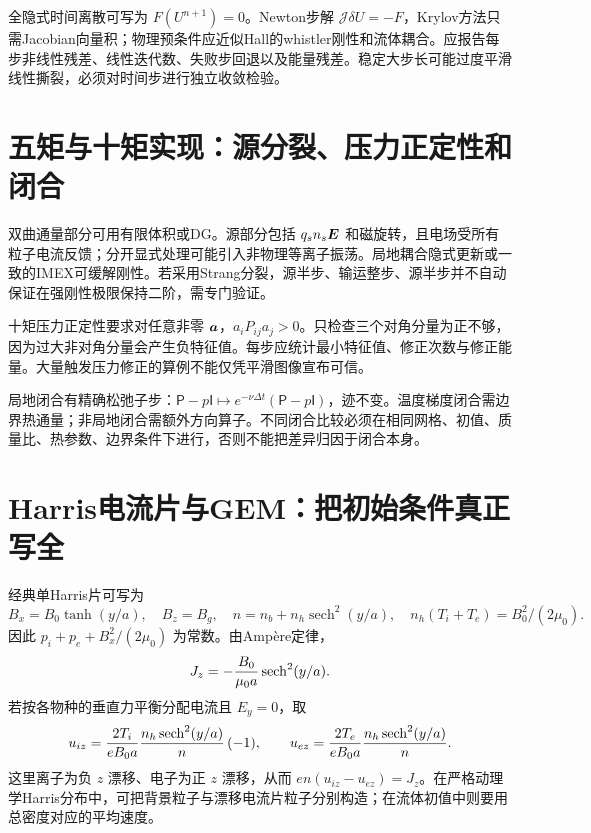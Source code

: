 \documentclass[UTF8,a4paper,11pt,openany,fontset=fandol]{ctexbook}
\begin{document}
全隐式时间离散可写为 $F(U^{n+1})=0$。Newton步解 $\mathcal J\delta U=-F$，Krylov方法只需Jacobian向量积；物理预条件应近似Hall的whistler刚性和流体耦合。应报告每步非线性残差、线性迭代数、失败步回退以及能量残差。稳定大步长可能过度平滑线性撕裂，必须对时间步进行独立收敛检验。\citep{Arnold2008,Toth2008}

\section{五矩与十矩实现：源分裂、压力正定性和闭合}
双曲通量部分可用有限体积或DG。源部分包括 $q_sn_s\bm{E}$ 和磁旋转，且电场受所有粒子电流反馈；分开显式处理可能引入非物理等离子振荡。局地耦合隐式更新或一致的IMEX可缓解刚性。若采用Strang分裂，源半步、输运整步、源半步并不自动保证在强刚性极限保持二阶，需专门验证。

十矩压力正定性要求对任意非零 $\bm{a}$，$a_iP_{ij}a_j>0$。只检查三个对角分量为正不够，因为过大非对角分量会产生负特征值。每步应统计最小特征值、修正次数与修正能量。大量触发压力修正的算例不能仅凭平滑图像宣布可信。

局地闭合有精确松弛子步：$\mathsf P-p\mathsf I\mapsto e^{-\nu\Delta t}(\mathsf P-p\mathsf I)$，迹不变。温度梯度闭合需边界热通量；非局地闭合需额外方向算子。不同闭合比较必须在相同网格、初值、质量比、热参数、边界条件下进行，否则不能把差异归因于闭合本身。\citep{Wang2015,Ng2020,Ng2017,Closure2026}

\section{Harris电流片与GEM：把初始条件真正写全}
经典单Harris片可写为
\begin{equation}B_x=B_0\tanh(y/a),\quad B_z=B_g,\quad
n=n_b+n_h\operatorname{sech}^2(y/a),\quad
n_h(T_i+T_e)=B_0^2/(2\mu_0).
\end{equation}
因此 $p_i+p_e+B_x^2/(2\mu_0)$ 为常数。由Ampère定律，
\begin{equation}J_z=-{B_0\over\mu_0a}\operatorname{sech}^2(y/a).
\end{equation}
若按各物种的垂直力平衡分配电流且 $E_y=0$，取
\begin{equation}u_{iz}={2T_i\over eB_0a}{n_h\operatorname{sech}^2(y/a)\over n}\,(-1),\qquad
u_{ez}={2T_e\over eB_0a}{n_h\operatorname{sech}^2(y/a)\over n}.
\end{equation}
这里离子为负 $z$ 漂移、电子为正 $z$ 漂移，从而 $en(u_{iz}-u_{ez})=J_z$。在严格动理学Harris分布中，可把背景粒子与漂移电流片粒子分别构造；在流体初值中则要用总密度对应的平均速度。
\end{document}
